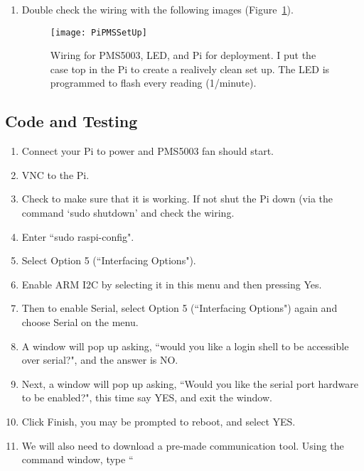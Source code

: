 \documentclass{article}
\begin{document}
\begin{enumerate}
\item Double check the wiring with the following images (Figure~\ref{fig:wiring}).

\begin{figure}
\texttt{[image: PiPMSSetUp]}
\caption{Wiring for PMS5003, LED, and Pi for deployment. I put the case top in the Pi to create a realively clean set up. The LED is programmed to flash every reading (1/minute).}
\label{fig:wiring}
\end{figure}

\end{enumerate}


\subsection{Code and Testing}

\begin{enumerate}
  \item Connect your Pi to power and PMS5003 fan should start.
  \item VNC to the Pi.
  \item Check to make sure that it is working. If not shut the Pi down (via the command `sudo shutdown' and check the wiring. 

\item Enter ``sudo raspi-config".

\item Select Option 5 (``Interfacing Options").

\item Enable ARM I2C by selecting it in this menu and then pressing Yes.

\item Then to enable Serial, select Option 5 (``Interfacing Options") again and choose Serial on the menu. 

\item A window will pop up asking, ``would you like a login shell to be accessible over serial?", and the answer is NO.

\item Next, a window will pop up asking, ``Would you like the serial port hardware to be enabled?", this time say YES, and exit the window.

\item Click Finish, you may be prompted to reboot, and select YES.

\item We will also need to download a pre-made communication tool.  Using the command window, type ``

\end{enumerate}
\end{document}
